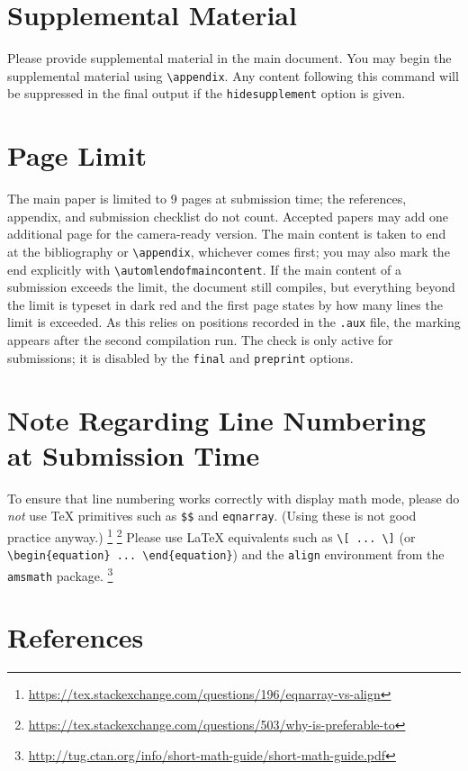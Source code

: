 \documentclass[11pt]{article}
\begin{document}
\section{Supplemental Material}

Please provide supplemental material in the main document. You may begin the
supplemental material using \verb|\appendix|. Any content following this command
will be suppressed in the final output if the \texttt{hidesupplement} option is
given.

\section{Page Limit}

The main paper is limited to 9 pages at submission time; the references,
appendix, and submission checklist do not count. Accepted papers may add one
additional page for the camera-ready version. The main content is taken to end
at the bibliography or \verb|\appendix|, whichever comes first; you may also mark
the end explicitly with \verb|\automlendofmaincontent|. If the main content of a
submission exceeds the limit, the document still compiles, but everything beyond
the limit is typeset in dark red and the first page states by how many lines the
limit is exceeded. As this relies on positions recorded in the \texttt{.aux}
file, the marking appears after the second compilation run. The check is only
active for submissions; it is disabled by the \texttt{final} and
\texttt{preprint} options.

\section{Note Regarding Line Numbering at Submission Time}

To ensure that line numbering works correctly with display math mode, please do
\emph{not} use \TeX{} primitives such as \verb|$$| and \texttt{eqnarray}.  (Using
these is not good practice anyway.)%
%
\footnote{\url{https://tex.stackexchange.com/questions/196/eqnarray-vs-align}}%
\footnote{\url{https://tex.stackexchange.com/questions/503/why-is-preferable-to}}
%
Please use \LaTeX{} equivalents such as \verb|\[ ... \]| (or
\verb|\begin{equation} ... \end{equation}|) and the \texttt{align} environment
from the \texttt{amsmath} package.%
%
\footnote{\url{http://tug.ctan.org/info/short-math-guide/short-math-guide.pdf}}

\section{References}
\end{document}
